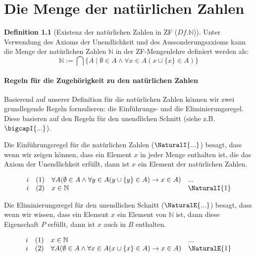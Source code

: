 \documentclass{book}
\theoremstyle{plain}
\theoremstyle{remark}
\theoremstyle{definition}
\newtheorem{definition}{Definition}[section]
\begin{document}
\chapter{Die Menge der natürlichen Zahlen}

\begin{definition}[Existenz der natürlichen Zahlen in ZF ($Df.\mathbb{N}$)]
	Unter Verwendung des Axioms der Unendlichkeit und des Aussonderungsaxioms kann die Menge der natürlichen Zahlen \( \mathbb{N} \) in der ZF-Mengenlehre definiert werden als:
	\[
	\mathbb{N} := \bigcap \{A\mid \emptyset \in A\land \forall x\in A(x\cup \{x\}\in A) \}
	\]
\end{definition}

\subsubsection{Regeln für die Zugehörigkeit zu den natürlichen Zahlen}
\label{rule:NaturalI} \label{rule:NaturalE}

Basierend auf unserer Definition für die natürlichen Zahlen können wir zwei grundlegende Regeln formulieren: die Einführungs- und die Eliminierungsregel. Diese basieren auf den Regeln für den unendlichen Schnitt (siehe z.B. $\bigcapI{...}$).

Die Einführungsregel für die natürlichen Zahlen (\( \NaturalI{...}\)) besagt, dass wenn wir zeigen können, dass ein Element \(x\) in jeder Menge enthalten ist, die das Axiom der Unendlichkeit erfüllt, dann ist \(x\) ein Element der natürlichen Zahlen.

\[
\begin{array}{llll}
	i & (1) & \forall A(\emptyset\in A\land \forall y\in A(y\cup \{y\}\in A)\rightarrow x\in A) & ... \\
	i & (2) & x\in \mathbb{N} & \NaturalI{1} \\
\end{array}
\]

Die Eliminierungsregel für den unendlichen Schnitt (\( \NaturalE{...}\)) besagt, dass wenn wir wissen, dass ein Element \(x\) ein Element von $\mathbb{N}$ ist, dann diese Eigenschaft \(P\) erfüllt, dann ist \(x\) auch in \(B\) enthalten.

\[
\begin{array}{llll}
	i & (1) & x\in \mathbb{N} & ... \\
	i & (2) & \forall A(\emptyset\in A\land \forall x\in A(x\cup \{x\}\in A)\rightarrow x\in A) & \NaturalE{1} \\
\end{array}
\]
\end{document}

